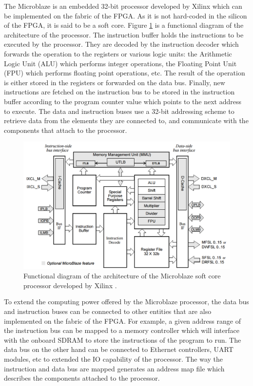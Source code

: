       The Microblaze \cite{Microblaze} is an embedded 32-bit processor developed by Xilinx which can be implemented on the fabric of the FPGA. As it is not hard-coded in the silicon of the FPGA, it is said to be a soft core. Figure \ref{fig:III-1-Microblaze} is a functional diagram of the architecture of the processor. The instruction buffer holds the instructions to be executed by the processor. They are decoded by the instruction decoder which forwards the operation to the registers or various logic units: the Arithmetic Logic Unit (ALU) which performs integer operations, the Floating Point Unit (FPU) which performs floating point operations, etc. The result of the operation is either stored in the registers or forwarded on the data bus. Finally, new instructions are fetched on the instruction bus to be stored in the instruction buffer according to the program counter value which points to the next address to execute. The data and instruction buses use a 32-bit addressing scheme to retrieve data from the elements they are connected to, and communicate with the components that attach to the processor. \\

      \begin{figure}[b!]
        \centering
        \includegraphics[width=\textwidth]{img/III-1-arch/Microblaze.png}
        \caption{Functional diagram of the architecture of the Microblaze soft core processor developed by Xilinx \cite{Microblaze}.}
        \label{fig:III-1-Microblaze}
      \end{figure}

      To extend the computing power offered by the Microblaze processor, the data bus and instruction buses can be connected to other entities that are also implemented on the fabric of the FPGA. For example, a given address range of the instruction bus can be mapped to a memory controller which will interface with the onboard SDRAM to store the instructions of the program to run. The data bus on the other hand can be connected to Ethernet controllers, UART modules, etc to extended the IO capability of the processor. The way the instruction and data bus are mapped generates an address map file which describes the components attached to the processor. \\

